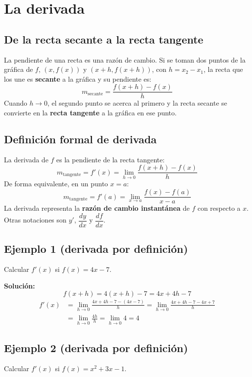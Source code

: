 \documentclass[12pt]{article}
\begin{document}
\section{La derivada}

\subsection{De la recta secante a la recta tangente}

La pendiente de una recta es una razón de cambio. Si se toman dos puntos de la gráfica de $f$, $(x, f(x))$ y $(x+h, f(x+h))$, con $h = x_2 - x_1$, la recta que los une es \textbf{secante} a la gráfica y su pendiente es:
\[
m_{\text{secante}} = \frac{f(x+h) - f(x)}{h}
\]
Cuando $h \to 0$, el segundo punto se acerca al primero y la recta secante se convierte en la \textbf{recta tangente} a la gráfica en ese punto.

\subsection{Definición formal de derivada}

La derivada de $f$ es la pendiente de la recta tangente:
\[
m_{\text{tangente}} = f'(x) = \lim_{h \to 0} \frac{f(x+h) - f(x)}{h}
\]
De forma equivalente, en un punto $x = a$:
\[
m_{\text{tangente}} = f'(a) = \lim_{x \to a} \frac{f(x) - f(a)}{x - a}
\]
La derivada representa la \textbf{razón de cambio instantánea} de $f$ con respecto a $x$. Otras notaciones son $y'$, $\dfrac{dy}{dx}$ y $\dfrac{df}{dx}$.

\subsection{Ejemplo 1 (derivada por definición)}
Calcular $f'(x)$ si $f(x) = 4x - 7$.

\textbf{Solución:}
\[
f(x+h) = 4(x+h) - 7 = 4x + 4h - 7
\]
\begin{align*}
f'(x) &= \lim_{h \to 0} \frac{4x + 4h - 7 - (4x - 7)}{h} = \lim_{h \to 0} \frac{4x + 4h - 7 - 4x + 7}{h} \\
&= \lim_{h \to 0} \frac{4h}{h} = \lim_{h \to 0} 4 = 4
\end{align*}

\subsection{Ejemplo 2 (derivada por definición)}
Calcular $f'(x)$ si $f(x) = x^2 + 3x - 1$.
\end{document}
